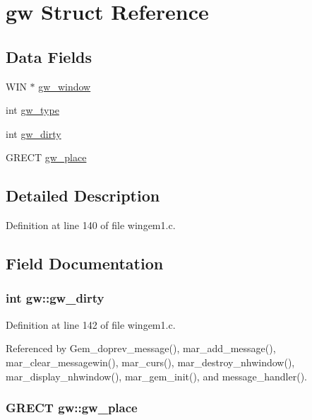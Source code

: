 \hypertarget{structgw}{\section{gw Struct Reference}
\label{structgw}
}
\subsection*{Data Fields}
\begin{DoxyCompactItemize}
\item 
W\+I\+N $\ast$ \hyperlink{structgw_ad6e5411019a4cfd1490cdd1e6f349d22}{gw\+\_\+window}
\item 
int \hyperlink{structgw_a2d83ece04b7783bc08bea9820c972913}{gw\+\_\+type}
\item 
int \hyperlink{structgw_a39e4a8ba487a7172ad1de08ee177f267}{gw\+\_\+dirty}
\item 
G\+R\+E\+C\+T \hyperlink{structgw_aa625b06be87338c43ac86affc1747023}{gw\+\_\+place}
\end{DoxyCompactItemize}


\subsection{Detailed Description}


Definition at line 140 of file wingem1.\+c.



\subsection{Field Documentation}
\hypertarget{structgw_a39e4a8ba487a7172ad1de08ee177f267}{
\subsubsection[{gw\+\_\+dirty}]{\setlength{\rightskip}{0pt plus 5cm}int gw\+::gw\+\_\+dirty}}\label{structgw_a39e4a8ba487a7172ad1de08ee177f267}


Definition at line 142 of file wingem1.\+c.



Referenced by Gem\+\_\+doprev\+\_\+message(), mar\+\_\+add\+\_\+message(), mar\+\_\+clear\+\_\+messagewin(), mar\+\_\+curs(), mar\+\_\+destroy\+\_\+nhwindow(), mar\+\_\+display\+\_\+nhwindow(), mar\+\_\+gem\+\_\+init(), and message\+\_\+handler().

\hypertarget{structgw_aa625b06be87338c43ac86affc1747023}{
\subsubsection[{gw\+\_\+place}]{\setlength{\rightskip}{0pt plus 5cm}G\+R\+E\+C\+T gw\+::gw\+\_\+place}}\label{structgw_aa625b06be87338c43ac86affc1747023}


